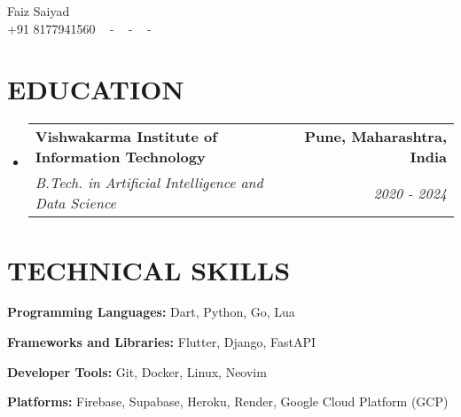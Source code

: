 \documentclass[letterpaper,11pt]{article}
\makeatletter
\newcommand{\resumeSubheading}[4]{
  \vspace{-2pt}\item
    \begin{tabular*}{1.0\textwidth}[t]{l@{\extracolsep{\fill}}r}
      \textbf{\large#1} & \textbf{\small #2} \\
      \textit{\large#3} & \textit{\small #4} \\

    \end{tabular*}\vspace{-7pt}
}
\newcommand{\resumeSubHeadingListStart}{\begin{itemize}[leftmargin=0.0in, label={}]}
\newcommand{\resumeSubHeadingListEnd}{\end{itemize}}
\makeatother
\begin{document}


\begin{center}
    {\huge Faiz Saiyad} \\ \vspace{2pt}
    {+91 8177941560} ~
    \small{-}
    \href{mailto:[fsaiyad990@gmail.com]}{\color{blue}{fsaiyad990@gmail.com}} ~
    \small{-}
    \href{https://linkedin.com/in/faiz-saiyad}{ \color{blue}{LinkedIn}}  ~
    \small{-}
    \href{https://github.com/Enhancifire}{ \color{blue}{Github}} ~
    \vspace{-7pt}
\end{center}

\section{\color{airforceblue}EDUCATION}
  \resumeSubHeadingListStart
    \resumeSubheading
      {Vishwakarma Institute of Information Technology}{Pune, Maharashtra, India}
      {B.Tech. in Artificial Intelligence and Data Science}{2020 - 2024}
  \resumeSubHeadingListEnd
  \vspace{-10pt}

\section{\color{airforceblue}TECHNICAL SKILLS}
 \begin{itemize}[leftmargin=0in, label={}]
    \small{\item{
     \textbf{\normalsize{Programming Languages:}}{ \normalsize{Dart, Python, Go, Lua}} \\
      \vspace{1.2pt}

     \textbf{\normalsize{Frameworks and Libraries:}}{ \normalsize{Flutter, Django, FastAPI}} \\
      \vspace{1.2pt}

     \textbf{\normalsize{Developer Tools:}}{ \normalsize{Git, Docker, Linux, Neovim}} \\
      \vspace{1.2pt}

     \textbf{\normalsize{Platforms:}}{ \normalsize{Firebase, Supabase, Heroku, Render, Google Cloud Platform (GCP)}}

     }}
 \end{itemize}
 \vspace{-16pt}
\end{document}

